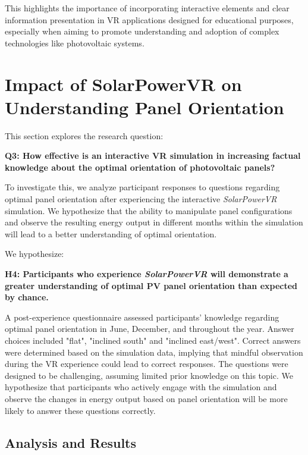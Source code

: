 \documentclass[draft, final]{vutinfth} %
\begin{document}
This highlights the importance of incorporating interactive elements and clear information presentation in VR applications designed for educational purposes, especially when aiming to promote understanding and adoption of complex technologies like photovoltaic systems.

\section{Impact of SolarPowerVR on Understanding Panel Orientation}

This section explores the research question:

\textbf{Q3: How effective is an interactive VR simulation in increasing factual knowledge about the optimal orientation of photovoltaic panels?}

To investigate this, we analyze participant responses to questions regarding optimal panel orientation after experiencing the interactive \textit{SolarPowerVR} simulation. We hypothesize that the ability to manipulate panel configurations and observe the resulting energy output in different months within the simulation will lead to a better understanding of optimal orientation.

We hypothesize:

\textbf{H4: Participants who experience \textit{SolarPowerVR} will demonstrate a greater understanding of optimal PV panel orientation than expected by chance.}

A post-experience questionnaire assessed participants' knowledge regarding optimal panel orientation in June, December, and throughout the year. Answer choices included "flat", "inclined south" and "inclined east/west". Correct answers were determined based on the simulation data, implying that mindful observation during the VR experience could lead to correct responses. The questions were designed to be challenging, assuming limited prior knowledge on this topic. We hypothesize that participants who actively engage with the simulation and observe the changes in energy output based on panel orientation will be more likely to answer these questions correctly.

\subsection{Analysis and Results}
\end{document}
